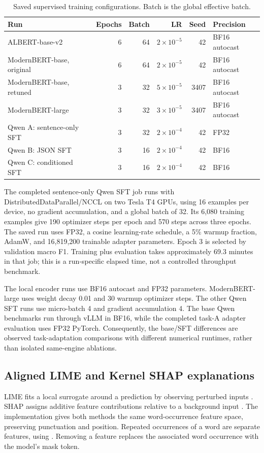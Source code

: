 \begin{table}[H]
\centering\scriptsize
\caption{Saved supervised training configurations. Batch is the global effective batch.}
\label{tab:training}
\begin{tabularx}{\linewidth}{Xrrrrl}
\toprule Run & Epochs & Batch & LR & Seed & Precision\\\midrule
ALBERT-base-v2 & 6 & 64 & $2\times10^{-5}$ & 42 & BF16 autocast\\
ModernBERT-base, original & 6 & 64 & $2\times10^{-5}$ & 42 & BF16 autocast\\
ModernBERT-base, retuned & 3 & 32 & $5\times10^{-5}$ & 3407 & BF16 autocast\\
ModernBERT-large & 3 & 32 & $3\times10^{-5}$ & 3407 & BF16 autocast\\
Qwen A: sentence-only SFT & 3 & 32 & $2\times10^{-4}$ & 42 & FP32\\
Qwen B: JSON SFT & 3 & 16 & $2\times10^{-4}$ & 42 & BF16\\
Qwen C: conditioned SFT & 3 & 16 & $2\times10^{-4}$ & 42 & BF16\\\bottomrule
\end{tabularx}
\end{table}

The completed sentence-only Qwen SFT job runs with DistributedDataParallel/NCCL on two Tesla T4 GPUs, using 16 examples per device, no gradient accumulation, and a global batch of 32. Its 6,080 training examples give 190 optimizer steps per epoch and 570 steps across three epochs. The saved run uses FP32, a cosine learning-rate schedule, a 5\% warmup fraction, AdamW, and 16,819,200 trainable adapter parameters. Epoch 3 is selected by validation macro F1. Training plus evaluation takes approximately 69.3 minutes in that job; this is a run-specific elapsed time, not a controlled throughput benchmark.

The local encoder runs use BF16 autocast and FP32 parameters. ModernBERT-large uses weight decay 0.01 and 30 warmup optimizer steps. The other Qwen SFT runs use micro-batch 4 and gradient accumulation 4. The base Qwen benchmarks run through vLLM in BF16, while the completed task-A adapter evaluation uses FP32 PyTorch. Consequently, the base/SFT differences are observed task-adaptation comparisons with different numerical runtimes, rather than isolated same-engine ablations.

\subsection{Aligned LIME and Kernel SHAP explanations}
LIME fits a local surrogate around a prediction by observing perturbed inputs \citep{ribeiro2016}. SHAP assigns additive feature contributions relative to a background input \citep{lundberg2017}. The implementation gives both methods the same word-occurrence feature space, preserving punctuation and position. Repeated occurrences of a word are separate features, using . Removing a feature replaces the associated word occurrence with the model's mask token.

